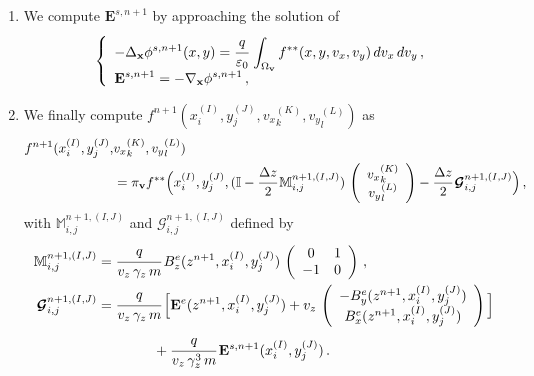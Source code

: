 \documentclass[10pt]{article}
\begin{document}
\begin{enumerate}
\item We compute $\mathbf{E}^{s,n+1}$ by approaching the solution of
\begin{equation}
\left\{
\begin{array}{l}
\displaystyle -\Delta_{\mathbf{x}}\phi^{s,n+1}(x,y) = \cfrac{q}{\varepsilon_{0}}\,\int_{\Omega_{\mathbf{v}}} f^{**}(x,y,v_{x},v_{y}) \, dv_{x}\,dv_{y} \, , \\
\displaystyle \mathbf{E}^{s,n+1} = -\nabla_{\mathbf{x}}\phi^{s,n+1} \, ,
\end{array}
\right.
\end{equation}

\item We finally compute $f^{n+1}(x_{i}^{(I)},y_{j}^{(J)},{v_{x}}_{k}^{(K)},{v_{y}}_{l}^{(L)})$ as
\begin{equation}
\begin{split}
f^{n+1}(x_{i}^{(I)},y_{j}^{(J)},&{v_{x}}_{k}^{(K)},{v_{y}}_{l}^{(L)}) \\
&= \pi_{\mathbf{v}}f^{**}\Big(x_{i}^{(I)},y_{j}^{(J)},(\mathbb{I}-\cfrac{\Delta z}{2}\,\mathbb{M}_{i,j}^{n+1,(I,J)})\, \left(
\begin{array}{c}
{v_{x}}_{k}^{(K)} \\ {v_{y}}_{l}^{(L)}
\end{array}
\right) - \cfrac{\Delta z}{2}\, \bm{\mathcal{G}}_{i,j}^{n+1,(I,J)} \Big) \, ,
\end{split}
\end{equation}
with $\mathbb{M}_{i,j}^{n+1,(I,J)}$ and $\bm{\mathcal{G}}_{i,j}^{n+1,(I,J)}$ defined by
\begin{equation}
\begin{split}
\mathbb{M}_{i,j}^{n+1,(I,J)} &= \cfrac{q}{v_{z}\,\gamma_{z}\,m} \, B_{z}^{e}(z^{n+1},x_{i}^{(I)},y_{j}^{(J)})\, \left(
\begin{array}{cc}
0 & 1 \\ -1 & 0
\end{array}
\right) \, , \\
\bm{\mathcal{G}}_{i,j}^{n+1,(I,J)} &= \cfrac{q}{v_{z}\,\gamma_{z}\,m}\,\Big[ \mathbf{E}^{e}(z^{n+1},x_{i}^{(I)},y_{j}^{(J)}) + v_{z}\,\left(
\begin{array}{c}
-B_{y}^{e}(z^{n+1},x_{i}^{(I)},y_{j}^{(J)}) \\ B_{x}^{e}(z^{n+1},x_{i}^{(I)},y_{j}^{(J)})
\end{array}
\right) \Big] \\
&\qquad \qquad + \cfrac{q}{v_{z}\,\gamma_{z}^{3}\,m} \, \mathbf{E}^{s,n+1}(x_{i}^{(I)},y_{j}^{(J)}) \, .
\end{split}
\end{equation}
\end{enumerate}
\end{document}
